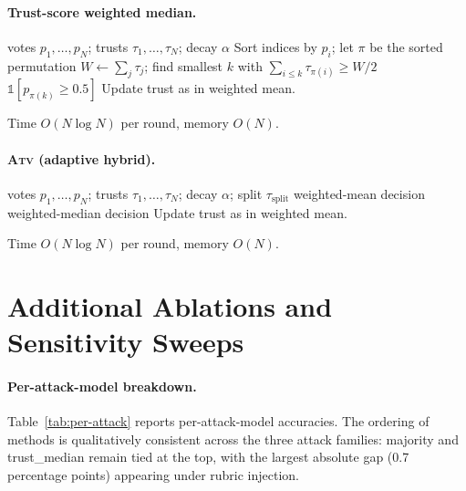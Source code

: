 \documentclass[11pt]{article}
\begin{document}
\paragraph{Trust-score weighted median.}
\begin{algorithmic}[1]
\Require votes $p_1, \ldots, p_N$; trusts $\tau_1, \ldots, \tau_N$; decay $\alpha$
\State Sort indices by $p_i$; let $\pi$ be the sorted permutation
\State $W \gets \sum_j \tau_j$; find smallest $k$ with $\sum_{i \leq k} \tau_{\pi(i)} \geq W/2$
\State \Return $\mathbb{1}[p_{\pi(k)} \geq 0.5]$
\State Update trust as in weighted mean.
\end{algorithmic}
Time $O(N \log N)$ per round, memory $O(N)$.

\paragraph{\textsc{Atv} (adaptive hybrid).}
\begin{algorithmic}[1]
\Require votes $p_1, \ldots, p_N$; trusts $\tau_1, \ldots, \tau_N$; decay $\alpha$; split $\tau_{\text{split}}$
  \State \Return weighted-mean decision
\Else
  \State \Return weighted-median decision
\EndIf
\State Update trust as in weighted mean.
\end{algorithmic}
Time $O(N \log N)$ per round, memory $O(N)$.

\section{Additional Ablations and Sensitivity Sweeps}
\label{app:ablation}

\paragraph{Per-attack-model breakdown.}
Table~\ref{tab:per-attack} reports per-attack-model accuracies. The
ordering of methods is qualitatively consistent across the three
attack families: majority and trust\_median remain tied at the top,
with the largest absolute gap (0.7 percentage points) appearing
under rubric injection.
\end{document}
